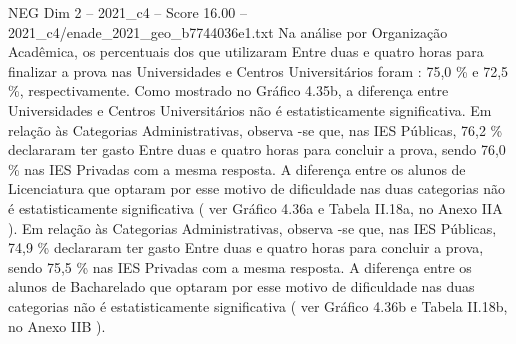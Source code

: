\begin{textsample}{NEG Dim 2 – 2021\_c4 – Score 16.00 – 2021\_c4/enade\_2021\_geo\_b7744036e1.txt}
Na análise por Organização Acadêmica, os percentuais dos que utilizaram Entre duas e quatro horas para finalizar a prova nas Universidades e Centros Universitários foram : 75,0 \% e 72,5 \%, respectivamente.
Como mostrado no Gráfico 4.35b, a diferença entre Universidades e Centros Universitários não é estatisticamente significativa.
Em relação às Categorias Administrativas, observa -se que, nas IES Públicas, 76,2 \% declararam ter gasto Entre duas e quatro horas para concluir a prova, sendo 76,0 \% nas IES Privadas com a mesma resposta.
A diferença entre os alunos de Licenciatura que optaram por esse motivo de dificuldade nas duas categorias não é estatisticamente significativa ( ver Gráfico 4.36a e Tabela II.18a, no Anexo IIA ).
Em relação às Categorias Administrativas, observa -se que, nas IES Públicas, 74,9 \% declararam ter gasto Entre duas e quatro horas para concluir a prova, sendo 75,5 \% nas IES Privadas com a mesma resposta.
A diferença entre os alunos de Bacharelado que optaram por esse motivo de dificuldade nas duas categorias não é estatisticamente significativa ( ver Gráfico 4.36b e Tabela II.18b, no Anexo IIB ).

\end{textsample}

